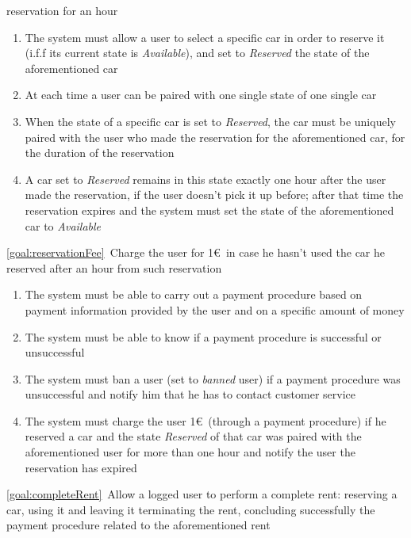 \begin{description}
 	  	reservation for an hour
 	  		\begin{enumerate}[resume*]
 	  			\item The system must allow a user to select a specific car in order to reserve it 
 	  			(i.f.f its current state is \emph{Available}), and set to \emph{Reserved} the state of
 	  			the aforementioned car
 	  			\item At each time a user can be paired with one single state of one single car
 	  			\item When the state of a specific car is set to \emph{Reserved}, the car must be
 	  			uniquely paired with the user who made the reservation for the aforementioned car, for
 	  			the duration of the reservation
 	  			\item A car set to \emph{Reserved} remains in this state exactly one hour after the user
 	  			made the reservation, if the user doesn't pick it up before; after that time the reservation expires and the system
 	  			must set the state of the aforementioned car to \emph{Available}
   			\end{enumerate}
  		\item \ref{goal:reservationFee}\ Charge the user for 1\euro\ in case he hasn't used the car he reserved after an hour from such reservation
  			\begin{enumerate}[resume*]
  				\item The system must be able to carry out a payment procedure based on payment
  				information provided by the user and on a specific amount of money
  				\item The system must be able to know if a payment procedure is successful or
  				unsuccessful
  				\item The system must ban a user (set to \emph{banned} user) if a
  				payment procedure was unsuccessful and notify him that he has to
  				contact customer service
  				\item The system must charge the user 1\euro\ (through a payment procedure) if
  				he reserved a car and the state \emph{Reserved} of that car was paired with the
  				aforementioned user for more than one hour and notify the user the reservation has
  				expired
   			\end{enumerate}
  		\item \ref{goal:completeRent}\ Allow a logged user to perform a complete rent: reserving a car, using it and leaving it terminating the rent, concluding successfully the payment procedure related to the aforementioned rent
  			\begin{enumerate}[resume*]

\end{enumerate}
\end{description}
